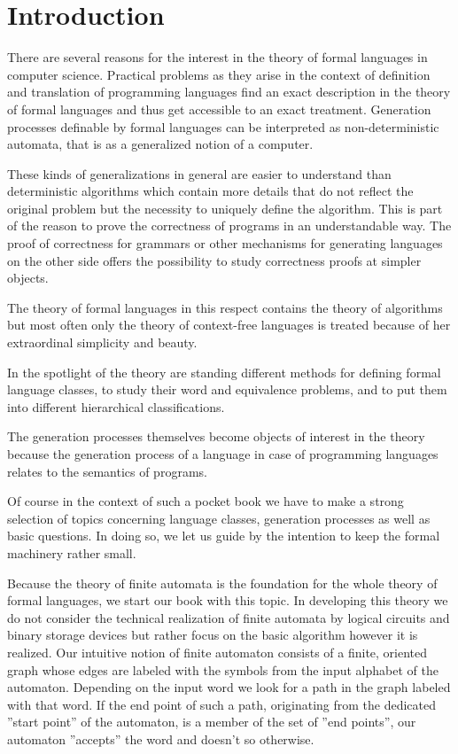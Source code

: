 \chapter*{Introduction}

There are several reasons for the interest in the theory of formal languages in
computer science. Practical problems as they arise in the context of definition
and translation of programming languages find an exact description in the theory
of formal languages and thus get accessible to an exact treatment. Generation
processes definable by formal languages can be interpreted as non-deterministic
automata, that is as a generalized notion of a computer.

These kinds of generalizations in general are easier to understand than
deterministic algorithms which contain more details that do not reflect the
original problem but the necessity to uniquely define the algorithm. This is
part of the reason to prove the correctness of programs in an understandable
way. The proof of correctness for grammars or other mechanisms for generating
languages on the other side offers the possibility to study correctness proofs
at simpler objects.

The theory of formal languages in this respect contains the theory of
algorithms but most often only the theory of context-free languages is treated
because of her extraordinal simplicity and beauty.

In the spotlight of the theory are standing different methods for defining
formal language classes, to study their word and equivalence problems, and to
put them into different hierarchical classifications.

The generation processes themselves become objects of interest in the theory
because the generation process of a language in case of programming languages
relates to the semantics of programs.

Of course in the context of such a pocket book we have to make a strong
selection of topics concerning language classes, generation processes as well as
basic questions. In doing so, we let us guide by the intention to keep the
formal machinery rather small.

Because the theory of finite automata is the foundation for the whole theory of
formal languages, we start our book with this topic. In developing this theory
we do not consider the technical realization of finite automata by logical
circuits and binary storage devices but rather focus on the basic algorithm however it is realized.
 Our intuitive notion of finite automaton consists of a finite, oriented graph whose 
edges are labeled with the symbols from the input alphabet of the automaton. 
Depending on the input word we look for a path in the graph labeled with that
word. If the end point of such a path, originating from the dedicated ''start point'' 
of the automaton, is a member of the set of ''end points'', our automaton
''accepts'' the word and doesn't so otherwise.

